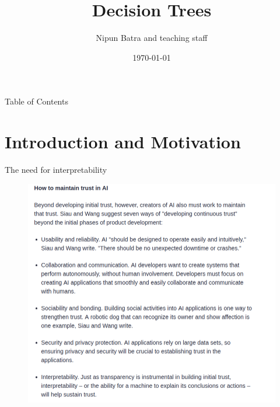 \documentclass[usenames,dvipsnames]{beamer}
\title{Decision Trees}
\date{\today}
\author{Nipun Batra and teaching staff}
\institute{IIT Gandhinagar}
\begin{document}
\maketitle

\begin{frame}{Table of Contents}
    \tableofcontents[hideallsubsections]
\end{frame}

\section{Introduction and Motivation}
	
\begin{frame}{The need for interpretability}
\begin{figure}
    \centering
    \includegraphics[scale=0.29]{../assets/decision-trees/diagrams/interpretability}
    \label{fig:interpretability}
\end{figure}
	
\end{frame}
	
\renewcommand{\arraystretch}{0.85}
\end{document}
